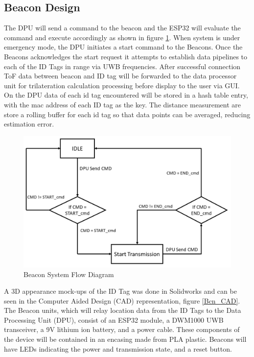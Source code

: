 \subsection{Beacon Design}
The DPU will send a command to the beacon and the ESP32 will evaluate the command and execute accordingly as shown in figure \ref{bcn_flow}. When system is under emergency mode, the DPU initiates a start command to the Beacons. Once the Beacons acknowledges the start request it attempts to establish data pipelines to each of the ID Tags in range via UWB frequencies. After successful connection ToF data between beacon and ID tag will be forwarded to the data processor unit for trilateration calculation processing before display to the user via GUI. On the DPU data of each id tag encountered will be stored in a hash table entry, with the mac address of each ID tag as the key. The distance measurement are store a rolling buffer for each id tag so that data points can be averaged, reducing estimation error.\\

\bigskip
\begin{figure}[H]
\centering
    \includegraphics[width=\linewidth]{./images/beacon_flow.png}
    \caption{Beacon System Flow Diagram}
    \label{bcn_flow}
\end{figure}
\medskip

\pagebreak
A 3D appearance mock-ups of the ID Tag was done in Solidworks and can be seen in the Computer Aided Design (CAD) representation, figure \ref{Bcn_CAD}. The Beacon units, which will relay location data from the ID Tags to the Data Processing Unit (DPU), consist of an ESP32 module, a DWM1000 UWB transceiver, a 9V lithium ion battery, and a power cable. These components of the device will be contained in an encasing made from PLA plastic. Beacons will have LEDs indicating the power and transmission state, and a reset button. 

